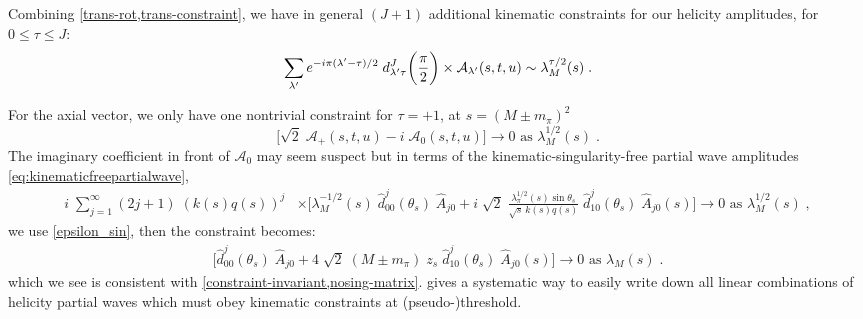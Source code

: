 Combining \cref{trans-rot,trans-constraint}, we have in general \((J + 1)\) additional kinematic constraints for our helicity amplitudes, for \(0 \leq \tau \leq J\):
  \begin{equation}
    \sum_{{\lambda^\prime}} e^{-i\pi ({\lambda^\prime} - \tau)/2} \; d^J_{{\lambda^\prime} \tau}\bigg(\frac{\pi}{2} \bigg) \times \mathcal{A}_{\lambda^\prime}(s,t,u) \sim \lambda^{\tau/2}_M(s)   \; .
  \end{equation}

For the axial vector, we only have one nontrivial constraint for \(\tau = +1\), at \(s = (M \pm  m_\pi)^2\)
  \begin{equation}
      \bigg[ \sqrt{2} \; \mathcal{A}_+(s,t,u) - i \; \mathcal{A}_0(s,t,u) \bigg] \to 0 \text{ as } \lambda^{1/2}_M(s) \; .
  \end{equation}
%
The imaginary coefficient in front of \(\mathcal{A}_0\) may seem suspect but in terms of the kinematic-singularity-free partial wave amplitudes \cref{eq:kinematicfreepartialwave},
  \begin{align}
          i \;  \sum_{j=1}^\infty (2j+1) \; (k(s)q(s))^{j} &\times
          \bigg[\lambda_M^{-1/2}(s) \; \hat{d}_{00}^j(\theta_s) \; \hat{A}_{j0}
           + i \; \sqrt{2} \; \frac{\lambda^{1/2}_\pi(s) \sin \theta_s}{\sqrt{s} \, k(s)q(s)} \; \hat{d}_{10}^j(\theta_s) \; \hat{A}_{j0}(s) \bigg]
           \to 0 \text{ as } \lambda^{1/2}_M(s) \; ,
  \end{align}
we use \cref{epsilon_sin}, then the constraint becomes:
  \begin{align}
          \bigg[\hat{d}_{00}^j(\theta_s) \; \hat{A}_{j0}
           + 4 \; \sqrt{2} \; (M \pm m_\pi) \; z_s \; \hat{d}_{10}^j(\theta_s) \; \hat{A}_{j0}(s) \bigg]
           \to 0 \text{ as } \lambda_M(s) \; .
  \end{align}
which we see is consistent with \cref{constraint-invariant,nosing-matrix}.  gives a systematic way to easily write down all linear combinations of helicity partial waves which must obey kinematic constraints at (pseudo-)threshold.
